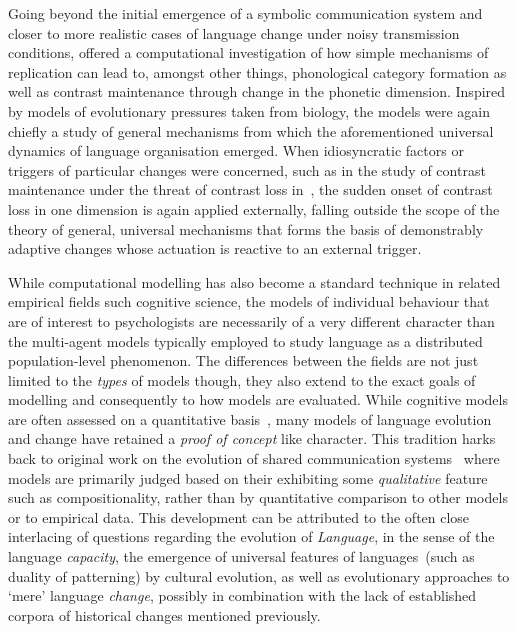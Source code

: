 Going beyond the initial emergence of a symbolic communication system and closer to more realistic cases of language change under noisy transmission conditions,
\citet{Wedel2004,Wedel2006} offered a computational investigation of how simple mechanisms of replication can lead to, amongst other things, phonological category formation as well as contrast maintenance through change in the phonetic dimension. Inspired by models of evolutionary pressures taken from biology, the models were again chiefly a study of general mechanisms from which the aforementioned universal dynamics of language organisation emerged. When idiosyncratic factors or triggers of particular changes were concerned, such as in the study of contrast maintenance under the threat of contrast loss in~\citet{Wedel2006}, the sudden onset of contrast loss in one dimension is again applied externally, falling outside the scope of the theory of general, universal mechanisms that forms the basis of demonstrably adaptive changes whose actuation is reactive to an external trigger.

While computational modelling has also become a standard technique in related empirical fields such cognitive science, the models of individual behaviour that are of interest to psychologists are necessarily of a very different character than the multi-agent models typically employed to study language as a distributed population-level phenomenon.
The differences between the fields are not just limited to the \emph{types} of models though, they also extend to the exact goals of modelling and consequently to how models are evaluated.
While cognitive models are often assessed on a quantitative basis~\citep{Busemeyer2010}, many models of language evolution and change have retained a \emph{proof of concept} like character. This tradition harks back to original work on the evolution of shared communication systems~\citep{Steels1995,Kirby2000} where models are primarily judged based on their exhibiting some \emph{qualitative} feature such as compositionality, rather than by quantitative comparison to other models or to empirical data.
This development can be attributed to the often close~\citep[and sometimes confusing;][]{Haspelmath2016} interlacing of questions regarding the evolution of \emph{Language}, in the sense of the language \emph{capacity}, the emergence of universal features of languages~(such as duality of patterning) by cultural evolution, as well as evolutionary approaches to `mere' language \emph{change}, possibly in combination with the lack of established corpora of historical changes mentioned previously.


